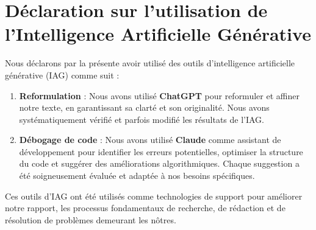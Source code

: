 \chapter*{Déclaration sur l'utilisation de l'Intelligence Artificielle Générative}
{}
Nous déclarons par la présente avoir utilisé des outils d'intelligence artificielle générative (IAG) comme suit :
\begin{enumerate}
    \item \textbf{Reformulation} : Nous avons utilisé \textbf{ChatGPT} pour reformuler et affiner notre texte, en garantissant sa clarté et son originalité. Nous avons systématiquement vérifié et parfois modifié les résultats de l'IAG.
    \item \textbf{Débogage de code} : Nous avons utilisé \textbf{Claude} comme assistant de développement pour identifier les erreurs potentielles, optimiser la structure du code et suggérer des améliorations algorithmiques. Chaque suggestion a été soigneusement évaluée et adaptée à nos besoins spécifiques.
\end{enumerate}

\par Ces outils d'IAG ont été utilisés comme technologies de support pour améliorer notre rapport, les processus fondamentaux de recherche, de rédaction et de résolution de problèmes demeurant les nôtres.

\thispagestyle{empty}
\strut